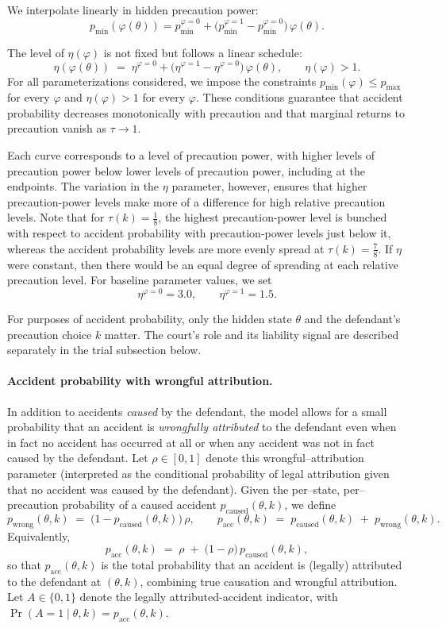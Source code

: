 \documentclass{article}
\begin{document}
We interpolate linearly in hidden precaution power:
\[
p_{\min}(\varphi(\theta)) = p_{\min}^{\varphi=0} +
\bigl(p_{\min}^{\varphi=1}-p_{\min}^{\varphi=0}\bigr)\,\varphi(\theta).
\]

The level of $\eta(\varphi)$ is not fixed but follows a linear schedule:
\[
\eta(\varphi(\theta)) \;=\; \eta^{\varphi=0} + 
\bigl(\eta^{\varphi=1}-\eta^{\varphi=0}\bigr)\,\varphi(\theta),
\qquad \eta(\varphi) > 1.
\]
For all parameterizations considered, we impose the constraints $p_{\min}(\varphi) \leq p_{\max}$ for every $\varphi$ and $\eta(\varphi) > 1$ for every $\varphi$. These conditions guarantee that accident probability decreases monotonically with precaution and that marginal returns to precaution vanish as $\tau \to 1$.

Each curve corresponds to a level of precaution power, with higher levels of precaution power below lower levels of precaution power, including at the endpoints. The variation in the $\eta$ parameter, however, ensures that higher precaution-power levels make more of a difference for high relative precaution levels. Note that for $\tau(k) = \tfrac{1}{8}$, the highest precaution-power level is bunched with respect to accident probability with precaution-power levels just below it, whereas the accident probability levels are more evenly spread at $\tau(k) = \tfrac{7}{8}$. If $\eta$ were constant, then there would be an equal degree of spreading at each relative precaution level. For baseline parameter values, we set
\[
\eta^{\varphi=0}=3.0, \qquad \eta^{\varphi=1}=1.5.
\]

For purposes of accident probability, only the hidden state $\theta$ and the defendant’s precaution choice $k$ matter. The court’s role and its liability signal are described separately in the trial subsection below.

\paragraph{Accident probability with wrongful attribution.}
In addition to accidents \emph{caused} by the defendant, the model allows for a small probability that an accident is \emph{wrongfully attributed} to the defendant even when in fact no accident has occurred at all or when any accident was not in fact caused by the defendant. Let $\rho\in[0,1]$ denote this wrongful–attribution parameter (interpreted as the conditional probability of legal attribution given that no accident was caused by the defendant). Given the per–state, per–precaution probability of a caused accident $p_{\mathrm{caused}}(\theta,k)$, we define
\[
p_{\mathrm{wrong}}(\theta,k)\;=\;\bigl(1 - p_{\mathrm{caused}}(\theta,k)\bigr)\,\rho,
\qquad
p_{\mathrm{acc}}(\theta,k)\;=\;p_{\mathrm{caused}}(\theta,k)\;+\;p_{\mathrm{wrong}}(\theta,k).
\]
Equivalently,
\[
p_{\mathrm{acc}}(\theta,k)
\;=\;\rho \;+\; \bigl(1-\rho\bigr)\,p_{\mathrm{caused}}(\theta,k),
\]
so that $p_{\mathrm{acc}}(\theta,k)$ is the total probability that an accident is (legally) attributed to the defendant at $(\theta,k)$, combining true causation and wrongful attribution.
Let $A\in\{0,1\}$ denote the legally attributed-accident indicator, with $\Pr(A=1\mid \theta,k)=p_{\mathrm{acc}}(\theta,k)$.
\end{document}
